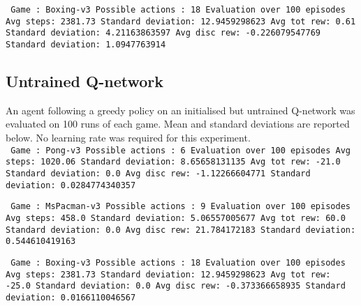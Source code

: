 \documentclass[paper=a4, fontsize=11pt]{scrartcl} %
\numberwithin{equation}{section} %
\numberwithin{figure}{section} %
\numberwithin{table}{section} %
\begin{document}
\texttt{
Game : Boxing-v3 \newline
Possible actions : 18 \newline
Evaluation over 100 episodes \newline
Avg steps: 2381.73 \quad\quad\quad\quad\quad\quad\quad\quad\quad Standard deviation: 12.9459298623 \newline
Avg tot rew: 0.61 \quad\quad\quad\quad\quad\quad\quad\quad\quad  Standard deviation: 4.21163863597 \newline
Avg disc rew: -0.226079547769 \quad\quad\quad  Standard deviation: 1.0947763914 \newline
}


\subsection{Untrained Q-network}
An agent following a greedy policy on an initialised but untrained Q-network was evaluated on 100 runs of each game. Mean and standard deviations are reported below. No learning rate was required for this experiment.\\

\texttt{
Game : Pong-v3 \newline
Possible actions : 6 \newline
Evaluation over 100 episodes \newline
Avg steps: 1020.06 \quad\quad\quad\quad\quad\quad\quad\quad Standard deviation: 8.65658131135 \newline
Avg tot rew: -21.0 \quad\quad\quad\quad\quad\quad\quad\quad Standard deviation: 0.0 \newline
Avg disc rew: -1.12266604771 \quad\quad\quad Standard deviation: 0.0284774340357 \newline
}

\texttt{
Game : MsPacman-v3 \newline
Possible actions : 9 \newline
Evaluation over 100 episodes \newline
Avg steps: 458.0 \quad\quad\quad\quad\quad\quad\quad\quad\quad Standard deviation: 5.06557005677 \newline
Avg tot rew: 60.0 \quad\quad\quad\quad\quad\quad\quad\quad\quad Standard deviation: 0.0 \newline
Avg disc rew: 21.784172183 \quad\quad\quad\quad Standard deviation: 0.544610419163 \newline
}

\texttt{
Game : Boxing-v3 \newline
Possible actions : 18 \newline
Evaluation over 100 episodes \newline
Avg steps: 2381.73 \quad\quad\quad\quad\quad\quad\quad\quad Standard deviation: 12.9459298623 \newline
Avg tot rew: -25.0 \quad\quad\quad\quad\quad\quad\quad\quad Standard deviation: 0.0 \newline
Avg disc rew: -0.373366658935 \quad\quad\quad Standard deviation: 0.0166110046567 \newline
}
\end{document}
